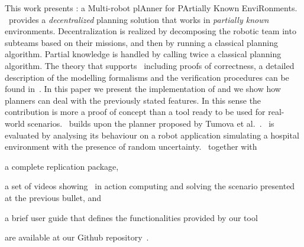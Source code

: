 


This work presents  \toolName: a Multi-robot plAnner for PArtially Known EnviRonments.
 \toolName\ provides a  \emph{decentralized} planning solution that works in \emph{partially known} environments.
Decentralization is realized by decomposing the robotic team into subteams based on their missions, and then by running a classical planning algorithm.
Partial knowledge is handled by calling twice a classical planning algorithm.
The theory that supports \toolName\ including proofs of correctness, a detailed description of the modelling formalisms and the verification procedures can be found in~\cite{menghi2018multi}.
In this paper we present the implementation of \toolName and we show how planners can deal with the previously stated features. In this sense the contribution is more a proof of concept than a tool ready to be used for real-world scenarios.
\toolName~builds upon the planner proposed by Tumova et al.~\cite{tumova2016multi}.
\toolName\ is evaluated by analysing its behaviour on a robot application simulating a hospital environment with the presence of random uncertainty.
\toolName\  together with 
\begin{enumerate*}
\item a complete replication package,
\item a set of videos showing \toolName\ in action computing and solving the scenario presented at the previous bullet, and
\item a brief user guide that defines the functionalities provided by our tool
\end{enumerate*}
 are available at our Github repository~\cite{repo}. %


